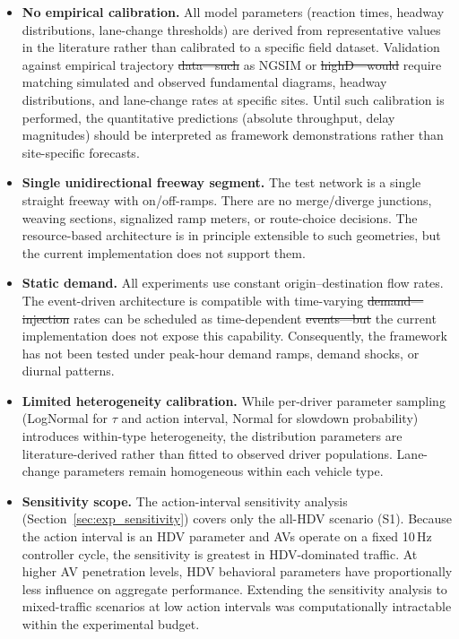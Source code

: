 \documentclass[review,authoryear]{elsarticle}
\providecommand{\DIFaddtex}[1]{{\protect\color{blue}\uwave{#1}}} %
\providecommand{\DIFdeltex}[1]{{\protect\color{red}\sout{#1}}}                      %
\providecommand{\DIFaddbegin}{} %
\providecommand{\DIFaddend}{} %
\providecommand{\DIFdelbegin}{} %
\providecommand{\DIFdelend}{} %
\providecommand{\DIFadd}[1]{\texorpdfstring{\DIFaddtex{#1}}{#1}} %
\providecommand{\DIFdel}[1]{\texorpdfstring{\DIFdeltex{#1}}{}} %
\newcommand{\DIFscaledelfig}{0.5}
\newlength{\DIFdelgraphicswidth} %
\newlength{\DIFdelgraphicsheight} %
\newcommand{\DIFaddincludegraphics}[2][]{{\color{blue}\fbox{\DIFOincludegraphics[#1]{#2}}}} %
\newcommand{\DIFdelincludegraphics}[2][]{%
\sbox{\DIFdelgraphicsbox}{\DIFOincludegraphics[#1]{#2}}%
\settoboxwidth{\DIFdelgraphicswidth}{\DIFdelgraphicsbox} %
\settoboxtotalheight{\DIFdelgraphicsheight}{\DIFdelgraphicsbox} %
\scalebox{\DIFscaledelfig}{%
\parbox[b]{\DIFdelgraphicswidth}{\usebox{\DIFdelgraphicsbox}\\[-\baselineskip] \rule{\DIFdelgraphicswidth}{0em}}\llap{\resizebox{\DIFdelgraphicswidth}{\DIFdelgraphicsheight}{%
\setlength{\unitlength}{\DIFdelgraphicswidth}%
\begin{picture}(1,1)%
\thicklines\linethickness{2pt} %
{\color[rgb]{1,0,0}\put(0,0){\framebox(1,1){}}}%
{\color[rgb]{1,0,0}\put(0,0){\line( 1,1){1}}}%
{\color[rgb]{1,0,0}\put(0,1){\line(1,-1){1}}}%
\end{picture}%
}\hspace*{3pt}}} %
} %
\DeclareRobustCommand{\DIFaddbegin}{\DIFOaddbegin \let\includegraphics\DIFaddincludegraphics} %
\DeclareRobustCommand{\DIFaddend}{\DIFOaddend \let\includegraphics\DIFOincludegraphics} %
\DeclareRobustCommand{\DIFdelbegin}{\DIFOdelbegin \let\includegraphics\DIFdelincludegraphics} %
\DeclareRobustCommand{\DIFdelend}{\DIFOaddend \let\includegraphics\DIFOincludegraphics} %
\begin{document}
\begin{itemize}
    \item \textbf{No empirical calibration.} All model parameters (reaction times, headway distributions, lane-change thresholds) are derived from representative values in the literature rather than calibrated to a specific field dataset. Validation against empirical trajectory \DIFdelbegin \DIFdel{data---such }\DIFdelend \DIFaddbegin \DIFadd{data such }\DIFaddend as NGSIM or \DIFdelbegin \DIFdel{highD---would }\DIFdelend \DIFaddbegin \DIFadd{highD would }\DIFaddend require matching simulated and observed fundamental diagrams, headway distributions, and lane-change rates at specific sites. Until such calibration is performed, the quantitative predictions (absolute throughput, delay magnitudes) should be interpreted as framework demonstrations rather than site-specific forecasts.

    \item \textbf{Single unidirectional freeway segment.} The test network is a single straight freeway with on/off-ramps. There are no merge/diverge junctions, weaving sections, signalized ramp meters, or route-choice decisions. The resource-based architecture is in principle extensible to such geometries, but the current implementation does not support them.

    \item \textbf{Static demand.} All experiments use constant origin--destination flow rates. The event-driven architecture is compatible with time-varying \DIFdelbegin \DIFdel{demand---injection }\DIFdelend \DIFaddbegin \DIFadd{demand (injection }\DIFaddend rates can be scheduled as time-dependent \DIFdelbegin \DIFdel{events---but }\DIFdelend \DIFaddbegin \DIFadd{events), but }\DIFaddend the current implementation does not expose this capability. Consequently, the framework has not been tested under peak-hour demand ramps, demand shocks, or diurnal patterns.

    \item \textbf{Limited heterogeneity calibration.} While per-driver parameter sampling (LogNormal for $\tau$ and action interval, Normal for slowdown probability) introduces within-type heterogeneity, the distribution parameters are literature-derived rather than fitted to observed driver populations. Lane-change parameters remain homogeneous within each vehicle type.

    \item \textbf{Sensitivity scope.} The action-interval sensitivity analysis (Section~\ref{sec:exp_sensitivity}) covers only the all-HDV scenario (S1). Because the action interval is an HDV parameter and AVs operate on a fixed 10\,Hz controller cycle, the sensitivity is greatest in HDV-dominated traffic. At higher AV penetration levels, HDV behavioral parameters have proportionally less influence on aggregate performance. Extending the sensitivity analysis to mixed-traffic scenarios at low action intervals was computationally intractable within the experimental budget.


\end{itemize}
\end{document}
